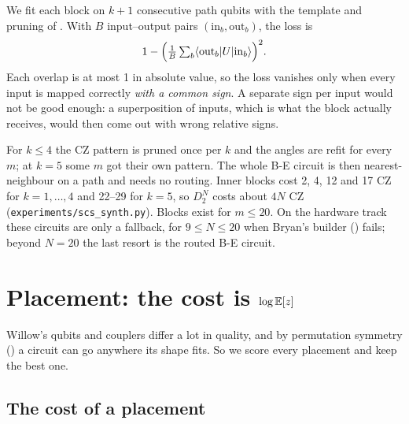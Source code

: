 \documentclass[11pt]{scrartcl}
\newcommand{\ket}[1]{\lvert #1\rangle}
\newcommand{\bra}[1]{\langle #1\rvert}
\newcommand{\D}[2]{D^{#1}_{#2}}
\newcommand{\CZ}{\ensuremath{\mathrm{CZ}}}
\newcommand{\file}[1]{\texttt{\small #1}}
\begin{document}
We fit each block on $k+1$ consecutive path qubits with the template and pruning of
. With $B$ input--output pairs $(\mathrm{in}_b,\mathrm{out}_b)$, the loss is
\[
  1-\Bigl(\tfrac1B\textstyle\sum_b\bra{\mathrm{out}_b}U\ket{\mathrm{in}_b}\Bigr)^2 .
\]
Each overlap is at most 1 in absolute value, so the loss vanishes only when every input is mapped
correctly \emph{with a common sign}. A separate sign per input would not be good enough: a
superposition of inputs, which is what the block actually receives, would then come out with wrong
relative signs.

For $k\le4$ the \CZ{} pattern is pruned once per $k$ and the angles are refit for every $m$; at $k=5$
some $m$ got their own pattern. The whole B-E circuit is then nearest-neighbour on a path and needs
no routing. Inner blocks cost 2, 4, 12 and 17 \CZ{} for $k=1,\dots,4$ and 22--29 for $k=5$, so $\D N2$
costs about $4N$ \CZ{} (\file{experiments/scs\_synth.py}). Blocks exist for $m\le20$. On the hardware
track these circuits are only a fallback, for $9\le N\le20$ when Bryan's builder ()
fails; beyond $N=20$ the last resort is the routed B-E circuit.

\section{Placement: the cost is \texorpdfstring{$\log\mathbb E[z]$}{log E[z]}}

Willow's qubits and couplers differ a lot in quality, and by permutation symmetry
() a circuit can go anywhere its shape fits. So we score every placement and
keep the best one.

\subsection{The cost of a placement}
\end{document}
